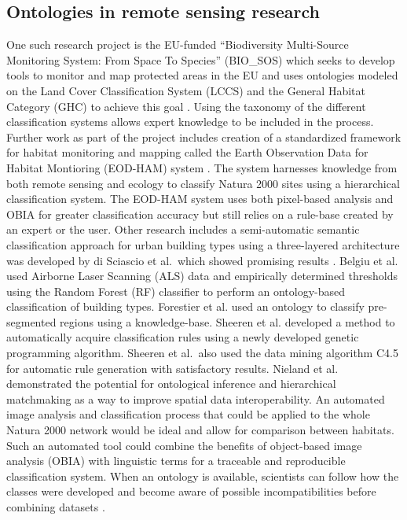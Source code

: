 \subsection{Ontologies in remote sensing research}
One such research project is the EU-funded ``Biodiversity Multi-Source
Monitoring System:
From Space To Species'' (BIO\_SOS) which seeks to develop tools to monitor and
map protected areas in the EU and uses ontologies modeled on the Land Cover
Classification System (LCCS) and the General Habitat Category (GHC) to achieve
this goal \citep{Arvor2013}. Using the taxonomy of the different classification
systems allows expert knowledge to be included in the process.
Further work as part of the project includes creation of a standardized
framework for habitat monitoring and mapping called the Earth Observation Data
for Habitat Montioring (EOD-HAM) system \citep{Lucas2015}. The system harnesses
knowledge from both remote sensing and ecology to classify Natura 2000 sites
using a hierarchical classification system. The EOD-HAM system uses both
pixel-based analysis and OBIA for greater classification accuracy but still
relies on a rule-base created by an expert or the user. Other research includes
a semi-automatic semantic classification approach for urban building types using
a three-layered architecture was developed by di Sciascio et al.\ which showed
promising results \citep{diSciascio2013}. Belgiu et al. \citep{Belgiu2014} used
Airborne Laser Scanning (ALS) data and empirically determined thresholds using
the Random Forest (RF) classifier to perform an ontology-based classification of
building types. Forestier et al. \citep{Forestier2012470} used an ontology to
classify pre-segmented regions using a knowledge-base. Sheeren et al.
\citep{Sheeren2006ML} developed a method to automatically acquire classification
rules using a newly developed genetic programming algorithm.
Sheeren et al.\ also used the data mining algorithm C4.5 for automatic rule
generation with satisfactory results. Nieland et al. \citep{Nieland2015}
demonstrated the potential for ontological inference and hierarchical
matchmaking as a way to improve spatial data interoperability. An automated
image analysis and classification process that could be applied to the whole
Natura 2000 network would be ideal and allow for comparison between habitats.
Such an automated tool could combine the benefits of object-based image analysis
(OBIA) with linguistic terms for a traceable and reproducible classification
system. When an ontology is available, scientists can follow how the classes
were developed and become aware of possible incompatibilities before combining
datasets \citep{Janowicz2012}.

